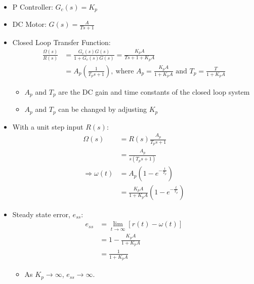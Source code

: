 \documentclass[a4paper]{article}
\begin{document}
\begin{center}
\end{center}

\begin{itemize}
    \item P Controller: $G_c(s) = K_p$
    \item DC Motor: $G(s) = \displaystyle\frac{A}{Ts+1}$
    \item Closed Loop Transfer Function:
    \begin{align*}
        \frac{\Omega(s)}{R(s)} &= \frac{G_c(s)G(s)}{1+G_c(s)G(s)}= \frac{K_pA}{Ts+1+K_pA}\\
        &= A_p\left(\frac{1}{T_ps+1}\right),\ \text{where }A_p = \frac{K_pA}{1+K_pA}\text{ and }T_p = \frac{T}{1+K_pA}
    \end{align*}
    \begin{itemize}[label=$\circ$]
        \item $A_p$ and $T_p$ are the DC gain and time constants of the closed loop system
        \item $A_p$ and $T_p$ can be changed by adjusting $K_p$
    \end{itemize}
    \item With a unit step input $R(s)$:
    \begin{align*}
        \Omega(s) &= R(s)\frac{A_p}{T_ps+1}\\
        &= \frac{A_p}{s(T_ps+1)}\\
        \Rightarrow \omega(t) &= A_p\left(1-e^{-\frac{t}{T_p}}\right)\\
        &= \frac{K_pA}{1+K_pA}\left(1-e^{-\frac{t}{T_p}}\right)
    \end{align*}
    \item Steady state error, $e_{ss}$:
    \begin{align*}
        e_{ss}&= \lim_{t\to\infty}[r(t)-\omega(t)]\\
        &= 1-\frac{K_pA}{1+K_pA}\\
        &= \frac{1}{1+K_pA}
    \end{align*}
    \begin{itemize}[label=$\circ$]
        \item As $K_p\to\infty$, $e_{ss}\to\infty$.
    \end{itemize}
\end{itemize}
\end{document}
